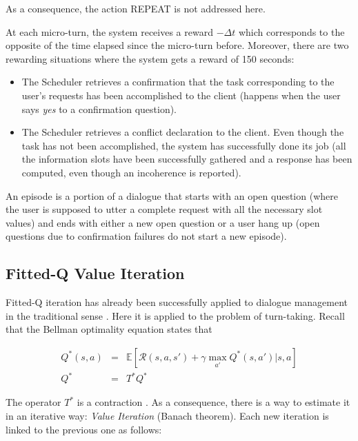 			As a consequence, the action REPEAT is not addressed here.
        
    	At each micro-turn, the system receives a reward $-\Delta t$ which corresponds to the opposite of the time elapsed since the micro-turn before. Moreover, there are two rewarding situations where the system gets a reward of 150 seconds:
        
        \begin{itemize}
        	\item The Scheduler retrieves a confirmation that the task corresponding to the user's requests has been accomplished to the client (happens when the user says \textit{yes} to a confirmation question).
            \item The Scheduler retrieves a conflict declaration to the client. Even though the task has not been accomplished, the system has successfully done its job (all the information slots have been successfully gathered and a response has been computed, even though an incoherence is reported).
        \end{itemize}
        
        An episode is a portion of a dialogue that starts with an open question (where the user is supposed to utter a complete request with all the necessary slot values) and ends with either a new open question or a user hang up (open questions due to confirmation failures do not start a new episode).
            
	\subsection{Fitted-Q Value Iteration}
    
    	Fitted-Q iteration has already been successfully applied to dialogue management in the traditional sense \cite{Chandramohan2010}. Here it is applied to the problem of turn-taking. Recall that the Bellman optimality equation states that
			
			\begin{eqnarray}
				Q^*(s,a) & = & \mathbb{E}[\mathscr{R} (s,a,s') + \gamma \max_{a'} Q^*(s,a') | s, a] \\
				Q^* & = & T^* Q^*
			\end{eqnarray}
			
				The operator $T^*$ is a contraction \cite{Bellman1957}. As a consequence, there is a way to estimate it in an iterative way: \textit{Value Iteration} (Banach theorem). Each new iteration is linked to the previous one as follows:
        
